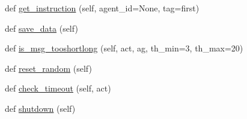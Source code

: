\begin{DoxyCompactItemize}
\item 
def \hyperlink{classprojects_1_1controllable__dialogue_1_1mturk_1_1worlds_1_1ControllableDialogEval_a787f3ae4c9c8e8ec24139a9fa39792b2}{get\+\_\+instruction} (self, agent\+\_\+id=None, tag=\textquotesingle{}first\textquotesingle{})
\item 
def \hyperlink{classprojects_1_1controllable__dialogue_1_1mturk_1_1worlds_1_1ControllableDialogEval_a6d1aa43ef1379b560f69b3f6d0a2dda3}{save\+\_\+data} (self)
\item 
def \hyperlink{classprojects_1_1controllable__dialogue_1_1mturk_1_1worlds_1_1ControllableDialogEval_acdbda424344d9c0bf3051e48f931a120}{is\+\_\+msg\+\_\+tooshortlong} (self, act, ag, th\+\_\+min=3, th\+\_\+max=20)
\item 
def \hyperlink{classprojects_1_1controllable__dialogue_1_1mturk_1_1worlds_1_1ControllableDialogEval_af2ae31b0c36bc96c0bb32860c7baaece}{reset\+\_\+random} (self)
\item 
def \hyperlink{classprojects_1_1controllable__dialogue_1_1mturk_1_1worlds_1_1ControllableDialogEval_ad39af000fb38494d1c229e3a84195c7b}{check\+\_\+timeout} (self, act)
\item 
def \hyperlink{classprojects_1_1controllable__dialogue_1_1mturk_1_1worlds_1_1ControllableDialogEval_ae8b524c714422712d76d9f572f56d95b}{shutdown} (self)
\end{DoxyCompactItemize}
